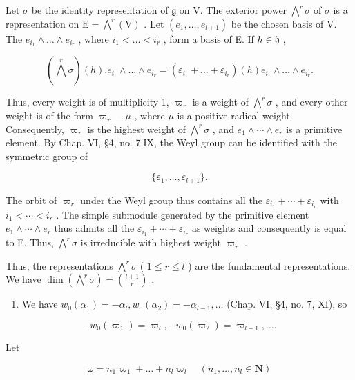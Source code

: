 Let \(\sigma\) be the identity representation of \(\mathfrak{g}\) on V. The exterior power \(\bigwedge^{r}\sigma\) of \(\sigma\) is a representation on \(\mathrm{E} = \bigwedge^{r}(\mathrm{V})\) . Let \((e_1,\ldots ,e_{l + 1})\) be the chosen basis of V. The \(e_{i_1}\wedge \dots \wedge e_{i_r}\) , where \(i_1 < \dots < i_r\) , form a basis of E. If \(h\in \mathfrak{h}\) ,

\[
(\bigwedge^ {r} \sigma) (h). e _ {i _ {1}} \wedge \dots \wedge e _ {i _ {r}} = (\varepsilon_ {i _ {1}} + \dots + \varepsilon_ {i _ {r}}) (h) e _ {i _ {1}} \wedge \dots \wedge e _ {i _ {r}}.
\]

Thus, every weight is of multiplicity 1, \(\varpi_{r}\) is a weight of \(\bigwedge^{r}\sigma\) , and every other weight is of the form \(\varpi_{r}-\mu\) , where \(\mu\) is a positive radical weight. Consequently, \(\varpi_{r}\) is the highest weight of \(\bigwedge^{r}\sigma\) , and \(e_{1}\wedge\cdots\wedge e_{r}\) is a primitive element. By Chap. VI, §4, no. 7.IX, the Weyl group can be identified with the symmetric group of

\[
\{\varepsilon_ {1}, \dots , \varepsilon_ {l + 1} \}.
\]

The orbit of \(\varpi_{r}\) under the Weyl group thus contains all the \(\varepsilon_{i_{1}} + \cdots + \varepsilon_{i_{r}}\) with \(i_{1} < \cdots < i_{r}\) . The simple submodule generated by the primitive element \(e_{1} \wedge \cdots \wedge e_{r}\) thus admits all the \(\varepsilon_{i_{1}} + \cdots + \varepsilon_{i_{r}}\) as weights and consequently is equal to E. Thus, \(\bigwedge^{r} \sigma\) is irreducible with highest weight \(\varpi_{r}\) .

Thus, the representations \(\bigwedge^{r}\sigma\) ( \(1 \leq r \leq l\) ) are the fundamental representations. We have \(\dim(\bigwedge^{r}\sigma) = \binom{l+1}{r}\) .

\begin{enumerate}
\def\labelenumi{(\Alph{enumi})}
\setcounter{enumi}{21}
\tightlist
\item
  We have \(w_0(\alpha_1) = -\alpha_l, w_0(\alpha_2) = -\alpha_{l-1}, \ldots\) (Chap. VI, §4, no. 7, XI), so
\end{enumerate}

\[
- w _ {0} (\varpi_ {1}) = \varpi_ {l}, - w _ {0} (\varpi_ {2}) = \varpi_ {l - 1}, \ldots .
\]

Let

\[
\omega = n _ {1} \varpi_ {1} + \dots + n _ {l} \varpi_ {l} \quad (n _ {1}, \ldots , n _ {l} \in \mathbf {N})
\]

